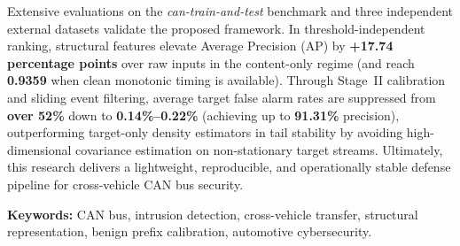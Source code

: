 \documentclass[12pt, a4paper, reqno, oneside]{book}
\renewcommand{\baselinestretch}{1.25}
\begin{document}
Extensive evaluations on the \textit{can-train-and-test} benchmark and three independent external datasets validate the proposed framework. In threshold-independent ranking, structural features elevate Average Precision (AP) by \textbf{+17.74 percentage points} over raw inputs in the content-only regime (and reach \textbf{0.9359} when clean monotonic timing is available). Through Stage~II calibration and sliding event filtering, average target false alarm rates are suppressed from \textbf{over 52\%} down to \textbf{0.14\%--0.22\%} (achieving up to \textbf{91.31\%} precision), outperforming target-only density estimators in tail stability by avoiding high-dimensional covariance estimation on non-stationary target streams. Ultimately, this research delivers a lightweight, reproducible, and operationally stable defense pipeline for cross-vehicle CAN bus security.

\medskip
\noindent\textbf{Keywords:} CAN bus, intrusion detection, cross-vehicle transfer, structural representation, benign prefix calibration, automotive cybersecurity.
\newpage

\begingroup
\small
\renewcommand{\baselinestretch}{0.95}\selectfont
\setlength{\parskip}{0pt}
\makeatletter
\renewcommand*\l@chapter[2]{%
  \ifnum \c@tocdepth >\m@ne
    \addpenalty{-\@highpenalty}%
    \vskip 0.25em \@plus\p@
    \setlength\@tempdima{1.5em}%
    \begingroup
      \parindent \z@ \rightskip \@pnumwidth
      \parfillskip -\@pnumwidth
      \leavevmode \bfseries
      \advance\leftskip\@tempdima
      \hskip -\leftskip
      #1\nobreak\hfil \nobreak\hb@xt@\@pnumwidth{\hss #2}\par
      \penalty\@highpenalty
    \endgroup
  \fi}
\makeatother
\tableofcontents
\endgroup
\clearpage

\clearpage
\begingroup
\small
\setlength{\parskip}{0pt}
{}
\listoffigures
\endgroup
\clearpage

\begingroup
\small
\setlength{\parskip}{0pt}
{}
\listoftables
\endgroup
\clearpage

\begingroup
\small
\setlength{\parskip}{0pt}
{}
\listofalgorithms
\endgroup
\clearpage
\end{document}

